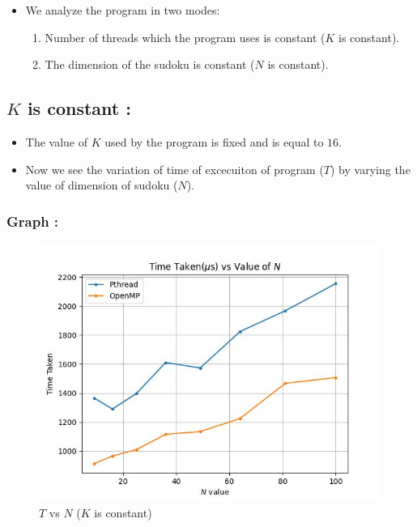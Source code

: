 \documentclass[12pt,a4paper]{article}
\begin{document}
	\begin{itemize}
		\item We analyze the program in two modes:
		\begin{enumerate}
			\item Number of threads which the program uses is constant ($K$ is constant).
			\item The dimension of the sudoku is constant ($N$ is constant).
	\end{enumerate}
	\end{itemize}
	
	\subsection{$K$ is constant :}
	\begin{itemize}
		\item The value of $K$ used by the program is fixed and is equal to $16$.
		\item Now we see the variation of time of excecuiton of program ($T$) by varying the value of dimension of sudoku ($N$).
	\end{itemize}

	
	\subsubsection{Graph :}
	\begin{figure}[H]
		\centering
		\includegraphics[width=1\textwidth]{plot_K_const}
		\caption{$T$ vs $N$ ($K$ is constant)}
	\end{figure}
\end{document}
